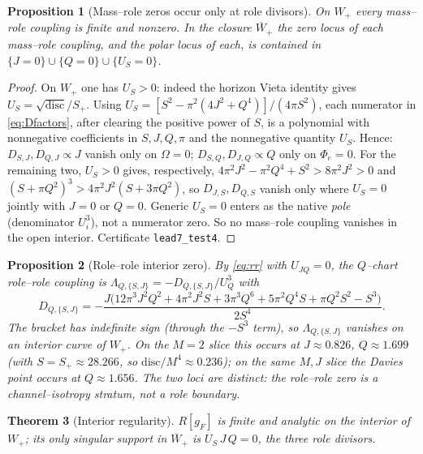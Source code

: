 \documentclass[11pt]{article}
\newtheorem{theorem}{Theorem}
\newtheorem{proposition}[theorem]{Proposition}
\newcommand{\Wp}{W_{+}}
\newcommand{\Sp}{S_{+}}
\begin{document}
\begin{proposition}[Mass--role zeros occur only at role divisors]
\label{prop:massfactor}
On $\Wp$ every mass--role coupling is finite and nonzero. In the closure $\overline\Wp$ the
zero locus of each mass--role coupling, and the polar locus of each, is contained in
$\{J=0\}\cup\{Q=0\}\cup\{U_S=0\}$.
\end{proposition}

\begin{proof}
On $\Wp$ one has $U_S>0$: indeed the horizon Vieta identity gives
$U_S=\sqrt{\mathrm{disc}}/\Sp$. Using $U_S=[S^2-\pi^2(4J^2+Q^4)]/(4\pi S^2)$, each numerator in
\eqref{eq:Dfactors}, after clearing the positive power of $S$, is a polynomial with nonnegative
coefficients in $S,J,Q,\pi$ and the nonnegative quantity $U_S$. Hence:
$D_{S,J},D_{Q,J}\propto J$ vanish only on $\Omega=0$; $D_{S,Q},D_{J,Q}\propto Q$ only on
$\Phi_e=0$. For the remaining two, $U_S>0$ gives, respectively,
$4\pi^2J^2-\pi^2Q^4+S^2>8\pi^2J^2>0$ and $(S+\pi Q^2)^3>4\pi^2J^2(S+3\pi Q^2)$, so
$D_{J,S},D_{Q,S}$ vanish only where $U_S=0$ jointly with $J=0$ or $Q=0$. Generic $U_S=0$ enters
as the native \emph{pole} (denominator $U_i^3$), not a numerator zero. So no mass--role coupling
vanishes in the open interior. Certificate \texttt{lead7\_test4}.
\end{proof}

\begin{proposition}[Role--role interior zero]
\label{prop:chargezero}
By \eqref{eq:rr} with $U_{JQ}=0$, the $Q$--chart role--role coupling is
$\Lambda_{Q,\{S,J\}}=-D_{Q,\{S,J\}}/U_Q^3$ with
\[
D_{Q,\{S,J\}}=-\frac{J\big(12\pi^3J^2Q^2+4\pi^2J^2S+3\pi^3Q^6+5\pi^2Q^4S+\pi Q^2S^2-S^3\big)}
{2S^4}.
\]
The bracket has indefinite sign (through the $-S^3$ term), so $\Lambda_{Q,\{S,J\}}$ vanishes on
an interior curve of $\Wp$. On the $M=2$ slice this occurs at $J\approx0.826$, $Q\approx1.699$
(with $S=\Sp\approx28.266$, so $\mathrm{disc}/M^4\approx0.236$); on the same $M,J$ slice the
Davies point occurs at $Q\approx1.656$. The two loci are distinct: the role--role zero is a
channel--isotropy stratum, not a role boundary.
\end{proposition}

\begin{theorem}[Interior regularity]
\label{thm:clean}
$R[g_F]$ is finite and analytic on the interior of $\Wp$; its only singular support in
$\overline\Wp$ is $U_S\,J\,Q=0$, the three role divisors.
\end{theorem}
\end{document}
